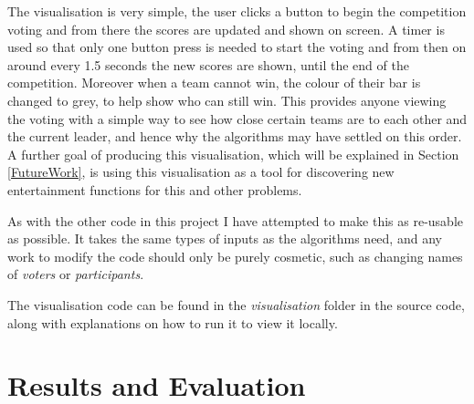 \documentclass[12pt]{report}
\begin{document}
The visualisation is very simple, the user clicks a button to begin the competition voting and from there the scores are updated and shown on screen. A timer is used so that only one button press is needed to start the voting and from then on around every 1.5 seconds the new scores are shown, until the end of the competition. Moreover when a team cannot win, the colour of their bar is changed to grey, to help show who can still win. This provides anyone viewing the voting with a simple way to see how close certain teams are to each other and the current leader, and hence why the algorithms may have settled on this order. A further goal of producing this visualisation, which will be explained in Section \ref{FutureWork}, is using this visualisation as a tool for discovering new entertainment functions for this and other problems. 

As with the other code in this project I have attempted to make this as re-usable as possible. It takes the same types of inputs as the algorithms need, and any work to modify the code should only be purely cosmetic, such as changing names of \textit{voters} or \textit{participants}.

The visualisation code can be found in the \textit{visualisation} folder in the source code, along with explanations on how to run it to view it locally.

\section{Results and Evaluation}\label{Results}
\end{document}
